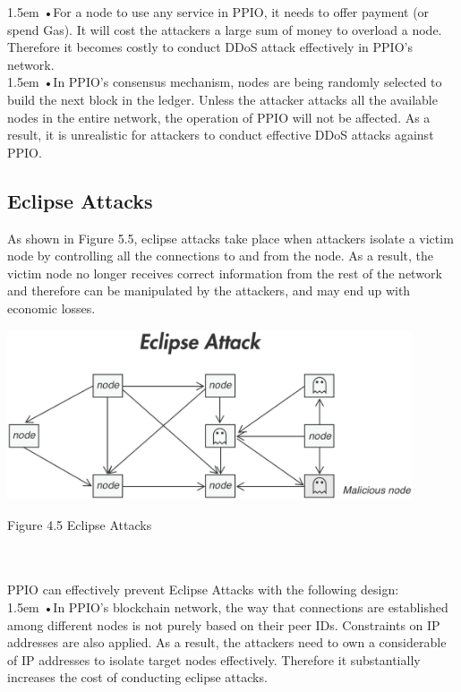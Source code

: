 \documentclass[10pt,a4paper]{article}
\begin{document}
\hangindent 1.5em
\noindent   
•\quad For a node to use any service in PPIO, it needs to offer payment (or spend Gas). It will cost the attackers a large sum of money to overload a node.  Therefore it becomes costly to conduct DDoS attack effectively in PPIO’s network.
   \vspace{-0.8em}
\\

\hangindent 1.5em
\noindent   
•\quad In PPIO’s consensus mechanism, nodes are being randomly selected to build the next block in the ledger. Unless the attacker attacks all the available nodes in the entire network, the operation of PPIO will not be affected. As a result, it is unrealistic for attackers to conduct effective DDoS attacks against PPIO.
   \vspace{-0.5em}
      \subsection{Eclipse Attacks}  %
As shown in Figure 5.5, eclipse attacks take place when attackers isolate a victim node by controlling all the connections to and from the node. As a result, the victim node no longer receives correct information from the rest of the network and therefore can be manipulated by the attackers, and may end up with economic losses.
\\
\centerline{\includegraphics[width=340pt]{fig19}}
 \centerline{{Figure 4.5 Eclipse Attacks }}
    \vspace{-1.5em}
\\ \\PPIO can effectively prevent Eclipse Attacks with the following design:
    \vspace{-0.6em}
\\

\hangindent 1.5em
\noindent   
•\quad In PPIO’s blockchain network,  the way that connections are established among different nodes is not purely based on their peer IDs. Constraints on IP addresses are also applied. As a result, the attackers need to own a considerable of IP addresses to isolate target nodes effectively. Therefore it substantially increases the cost of conducting eclipse attacks.
   \vspace{-0.6em}
\\
\end{document}
